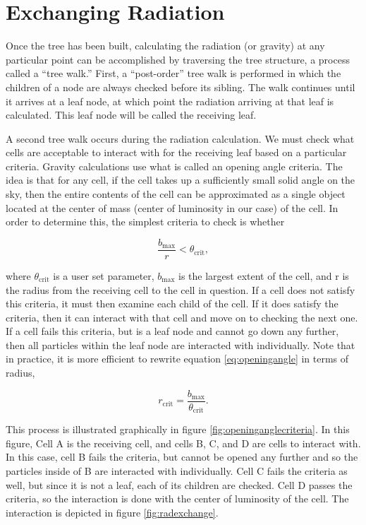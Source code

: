 \section{Exchanging Radiation}
\label{sec:exchangerad}

Once the tree has been built, calculating the radiation (or gravity) at any particular point can be accomplished by traversing the tree structure, a process called a ``tree walk.'' First, a ``post-order'' tree walk is performed in which the children of a node are always checked before its sibling. The walk continues until it arrives at a leaf node, at which point the radiation arriving at that leaf is calculated. This leaf node will be called the receiving leaf.

A second tree walk occurs during the radiation calculation. We must check what cells are acceptable to interact with for the receiving leaf based on a particular criteria. Gravity calculations use what is called an opening angle criteria. The idea is that for any cell, if the cell takes up a sufficiently small solid angle on the sky, then the entire contents of the cell can be approximated as a single object located at the center of mass (center of luminosity in our case) of the cell. In order to determine this, the simplest criteria to check is whether

\begin{equation}
\label{eq:openingangle}
\frac{b_{\mbox{max}}}{r} < \theta_{\mbox{crit}},
\end{equation}

\noindent
where $\theta_{\mbox{crit}}$ is a user set parameter, $b_{\mbox{max}}$ is the largest extent of the cell, and r is the radius from the receiving cell to the cell in question. If a cell does not satisfy this criteria, it must then examine each child of the cell. If it does satisfy the criteria, then it can interact with that cell and move on to checking the next one. If a cell fails this criteria, but is a leaf node and cannot go down any further, then all particles within the leaf node are interacted with individually. Note that in practice, it is more efficient to rewrite equation \ref{eq:openingangle} in terms of radius,

\begin{equation}
\label{eq:openingradius}
r_{\mbox{crit}} = \frac{b_{\mbox{max}}}{\theta_{\mbox{crit}}}.
\end{equation}

This process is illustrated graphically in figure \ref{fig:openinganglecriteria}. In this figure, Cell A is the receiving cell, and cells B, C, and D are cells to interact with. In this case, cell B fails the criteria, but cannot be opened any further and so the particles inside of B are interacted with individually. Cell C fails the criteria as well, but since it is not a leaf, each of its children are checked. Cell D passes the criteria, so the interaction is done with the center of luminosity of the cell. The interaction is depicted in figure \ref{fig:radexchange}.

